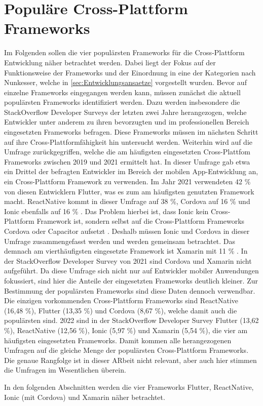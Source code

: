 \chapter{Populäre Cross-Plattform Frameworks}
\label{ch:Frameworks}

Im Folgenden sollen die vier populärsten Frameworks für die Cross-Plattform Entwicklung näher betrachtet werden.
Dabei liegt der Fokus auf der Funktionsweise der Frameworks und der Einordnung in eine der Kategorien nach Nunkesser, welche in \autoref{sec:Entwicklungsansaetze} vorgestellt wurden.
Bevor auf einzelne Frameworks eingegangen werden kann, müssen zunächst die aktuell populärsten Frameworks identifiziert werden.
Dazu werden insbesondere die StackOverflow Developer Surveys \cite{Stackoverflow_2021} \cite{Stackoverflow_2022} der letzten zwei Jahre herangezogen, welche Entwickler unter anderem zu ihren bevorzugten und im professionellen Bereich eingesetzten Frameworks befragen.
Diese Frameworks müssen im nächsten Schritt auf ihre Cross-Plattformfähigkeit hin untersucht werden.
Weiterhin wird auf die Umfrage \cite{Statista_UsedCrossPlatformFrameworks} zurückgegriffen, welche die am häufigsten eingesetzten Cross-Plattfom Frameworks zwischen 2019 und 2021 ermittelt hat.
In dieser Umfrage gab etwa ein Drittel der befragten Entwickler im Bereich der mobilen App-Entwicklung an, ein Cross-Plattform Framework zu verwenden.
Im Jahr 2021 verwendeten 42 \% von diesen Entwicklern Flutter, was es zum am häufigsten genutzten Framework macht.
ReactNative kommt in dieser Umfrage auf 38 \%, Cordova auf 16 \% und Ionic ebenfalls auf 16 \% \cite{Statista_UsedCrossPlatformFrameworks}.
Das Problem hierbei ist, dass Ionic kein Cross-Plattform Framework ist, sondern selbst auf die Cross-Plattform Frameworks Cordova oder Capacitor aufsetzt \cite{Ionic_Docs}.
Deshalb müssen Ionic und Cordova in dieser Umfrage zusammengefasst werden und werden gemeinsam betrachtet.
Das demnach am vierthäufigsten eingesetzte Framework ist Xamarin mit 11 \% \cite{Statista_UsedCrossPlatformFrameworks}.
In der StackOverflow Developer Survey von 2021 \cite{Stackoverflow_2021} sind Cordova und Xamarin nicht aufgeführt.
Da diese Umfrage sich nicht nur auf Entwickler mobiler Anwendungen fokussiert, sind hier die Anteile der eingesetzten Frameworks deutlich kleiner.
Zur Bestimmung der populärsten Frameworks sind diese Daten dennoch verwendbar.
Die einzigen vorkommenden Cross-Plattform Frameworks sind ReactNative (16,48 \%), Flutter (13,35 \%) und Cordova (8,67 \%), welche damit auch die populärsten sind.
2022 sind in der StackOverflow Developer Survey \cite{Stackoverflow_2022} Flutter (13,62 \%), ReactNative (12,56 \%), Ionic (5,97 \%) und Xamarin (5,54 \%), die vier am häufigsten eingesetzten Frameworks.
Damit kommen alle herangezogenen Umfragen auf die gleiche Menge der populärsten Cross-Plattform Frameworks.
Die genaue Rangfolge ist in dieser ARbeit nicht relevant, aber auch hier stimmen die Umfragen im Wesentlichen überein.

In den folgenden Abschnitten werden die vier Frameworks Flutter, ReactNative, Ionic (mit Cordova) und Xamarin näher betrachtet.

